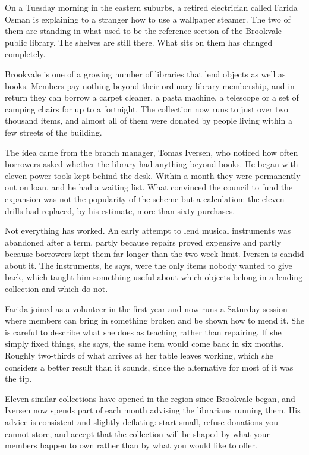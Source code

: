 \begin{ibtextbody}[paragraphs]
  On a Tuesday morning in the eastern suburbs, a retired electrician called
  Farida Osman is explaining to a stranger how to use a wallpaper steamer. The
  two of them are standing in what used to be the reference section of the
  Brookvale public library. The shelves are still there. What sits on them has
  changed completely.

  Brookvale is one of a growing number of libraries that lend objects as well
  as books. Members pay nothing beyond their ordinary library membership, and
  in return they can borrow a carpet cleaner, a pasta machine, a telescope or a
  set of camping chairs for up to a fortnight. The collection now runs to just
  over two thousand items, and almost all of them were donated by people living
  within a few streets of the building.

  The idea came from the branch manager, Tomas Iversen, who noticed how often
  borrowers asked whether the library had anything beyond books. He began with
  eleven power tools kept behind the desk. Within a month they were permanently
  out on loan, and he had a waiting list. What convinced the council to fund
  the expansion was not the popularity of the scheme but a calculation: the
  eleven drills had replaced, by his estimate, more than sixty purchases.

  Not everything has worked. An early attempt to lend musical instruments was
  abandoned after a term, partly because repairs proved expensive and partly
  because borrowers kept them far longer than the two-week limit. Iversen is
  candid about it. The instruments, he says, were the only items nobody wanted
  to give back, which taught him something useful about which objects belong in
  a lending collection and which do not.

  Farida joined as a volunteer in the first year and now runs a Saturday
  session where members can bring in something broken and be shown how to mend
  it. She is careful to describe what she does as teaching rather than
  repairing. If she simply fixed things, she says, the same item would come
  back in six months. Roughly two-thirds of what arrives at her table leaves
  working, which she considers a better result than it sounds, since the
  alternative for most of it was the tip.

  Eleven similar collections have opened in the region since Brookvale began,
  and Iversen now spends part of each month advising the librarians running
  them. His advice is consistent and slightly deflating: start small, refuse
  donations you cannot store, and accept that the collection will be shaped by
  what your members happen to own rather than by what you would like to offer.
\end{ibtextbody}

